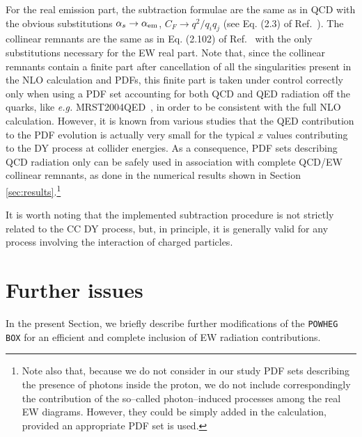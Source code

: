 \documentclass[11pt,a4paper]{article}
\newcommand\POWHEGBOX{\texttt{POWHEG BOX}}
\newcommand\aem{\alpha_{\rm em}}
\begin{document}
For the real emission part, the subtraction formulae are the same as in QCD with the obvious substitutions 
$\alpha_s \rightarrow \aem$, $C_F \rightarrow q^2/q_iq_j$ (see Eq. (2.3) of Ref.~\cite{Dittmaier:1999mb}). The collinear remnants are the same 
as in Eq. (2.102) of Ref.~\cite{Frixione:2007vw} with the only substitutions necessary for the EW real part. 
Note that, since the collinear remnants contain a finite part after cancellation of all the singularities present in the NLO calculation 
and PDFs, this finite part is taken under control correctly only when using a PDF set accounting for 
both QCD and QED radiation off the quarks, like {\it e.g.} MRST2004QED~\cite{Martin:2004dh}, in order to be 
consistent with the full NLO calculation. However, it is known from various studies that the 
QED contribution to the PDF evolution is actually very small for the typical $x$ values contributing to the
DY process at collider energies. As a consequence, PDF sets describing QCD radiation only 
can be safely used in association with complete QCD/EW collinear remnants, as done in 
the numerical results shown in Section \ref{sec:results}.\footnote{Note also that, because we do not
consider in our study PDF sets describing the presence of photons inside the proton, we do not include
correspondingly the contribution of the so--called photon--induced processes among the real EW diagrams. 
However, they could be simply added in the calculation, provided an appropriate PDF set is used.}

It is worth noting that the implemented subtraction procedure is not strictly related to the 
CC DY process, but, in principle, 
it is generally valid for any process involving the interaction of charged
particles.

\section{Further issues}
\label{sec:implementation}
In the present Section, we briefly describe further modifications of
the \POWHEGBOX{} for an efficient and complete inclusion of EW
radiation contributions.
\end{document}

